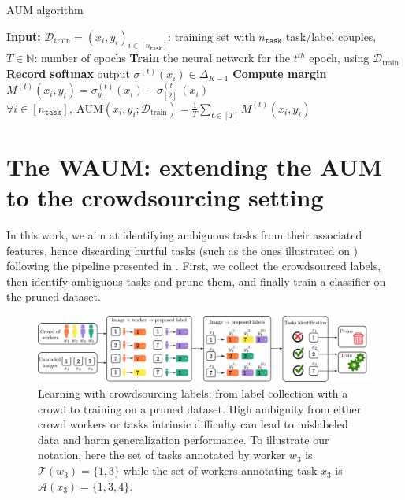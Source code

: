 \begin{algorithm}[htb]
    \caption{$\mathrm{AUM}$ algorithm}\label{alg:AUM}
    \begin{algorithmic}
    \STATE \textbf{Input:} $\mathcal{D}_{\text{train}}=(x_i, y_i)_{i\in[n_\texttt{task}]}$: training set with $n_\texttt{task}$ task/label couples, $T\in \mathbb{N}$: number of epochs
    \STATE \textbf{Train} the neural network for the $t^{th}$ epoch, using $\mathcal{D}_{\text{train}}$\;
    \STATE\textbf{Record softmax} output $\sigma^{(t)}(x_i)\in\Delta_{K-1}$\;
    \STATE\textbf{Compute margin} $M^{(t)}(x_i, y_i)=\sigma^{(t)}_{y_i}(x_i) - \sigma^{(t)}_{[2]}(x_i)$\;
    \ENDFOR
    \ENDFOR
    \STATE $\forall i\in[n_{\texttt{task}}],\ \mathrm{AUM}(x_i, y_i;\mathcal{D}_{\text{train}})=\frac{1}{T}\sum_{t\in[T]}M^{(t)}(x_i, y_i)$
\end{algorithmic}
\end{algorithm}

\section{The WAUM: extending the AUM to the crowdsourcing setting}

In this work, we aim at identifying ambiguous tasks from their associated features, hence discarding hurtful tasks (such as the ones illustrated on ) following the pipeline presented in . First, we collect the crowdsourced labels, then identify ambiguous tasks and prune them, and finally train a classifier on the pruned dataset.

\begin{figure}[thb]
    \centering
    \includegraphics[width=.9\textwidth]{images/schema_crowdsourcing_en_with_notation_times}
    \caption{Learning with crowdsourcing labels: from label collection with a crowd to training on a pruned dataset. High ambiguity from either crowd workers or tasks intrinsic difficulty can lead to mislabeled data and harm generalization performance. To illustrate our notation, here the set of tasks annotated by worker $w_3$ is $\mathcal{T}(w_3)=\{1,3\}$ while the set of workers annotating task $x_3$ is $\mathcal{A}(x_3)=\{1,3,4\}$.}
    \label{fig:crowdsourcing_scheme}
\end{figure}

